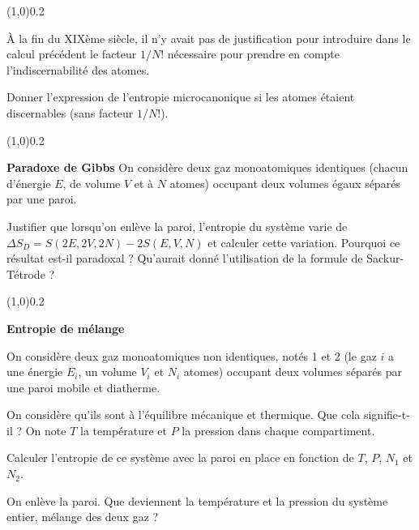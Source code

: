 \documentclass[utf8, 11pt]{feuille}
\begin{document}

\begin{center} \vspace{-0.5cm}\line(1,0){0.2\textwidth} \vspace{-0.5cm}\end{center}

\`A la fin du XIXème siècle, il n’y avait pas de justification pour introduire dans le calcul précédent le facteur $1/N!$  nécessaire pour prendre en compte l’indiscernabilité des atomes. 

\question Donner l’expression de l’entropie microcanonique si les atomes étaient discernables (sans facteur $1/N!$).

\begin{center} \vspace{-0.5cm}\line(1,0){0.2\textwidth} \vspace{-0.5cm}\end{center}

{\sffamily\bfseries{Paradoxe de Gibbs}}
On considère deux gaz monoatomiques identiques (chacun d'énergie $E$, de volume $V$ et à $N$ atomes) occupant deux volumes égaux séparés par une paroi. 

\question Justifier que lorsqu’on enlève la paroi, l’entropie du système varie de $\Delta S_D = S(2E, 2V, 2N)-2S(E, V, N)$ et calculer cette variation. Pourquoi ce résultat est-il paradoxal ? Qu'aurait donné l'utilisation de la formule de Sackur-Tétrode ?

\begin{center} \vspace{-0.5cm}\line(1,0){0.2\textwidth} \vspace{-0.5cm}\end{center}

{\sffamily\bfseries{Entropie de mélange}}

On considère deux gaz monoatomiques non identiques, notés 1 et 2 (le gaz $i$ a une énergie $E_i$, un volume $V_i$ et $N_i$ atomes) occupant deux volumes séparés par une paroi mobile et diatherme.

\medskip

\question On considère qu'ils sont à l'équilibre mécanique et thermique. Que cela signifie-t-il ? On note $T$ la température et $P$ la pression dans chaque compartiment.

\question Calculer l'entropie de ce système avec la paroi en place en fonction de  $T$, $P$, $N_1$ et $N_2$.

\question On enlève la paroi. Que deviennent la température et la pression du système entier, mélange des deux gaz ?
\end{document}
